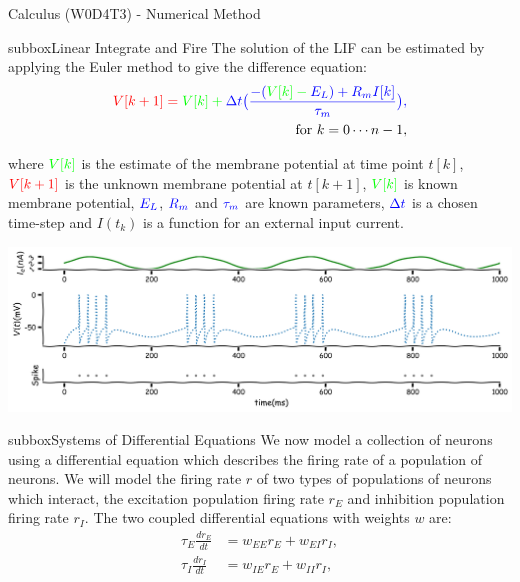 \begin{textbox}{Calculus (W0D4T3) - Numerical Method}
\begin{subbox}{subbox}{Linear Integrate and Fire }
\scriptsize
The solution of the LIF can be estimated by applying the Euler method to give the difference equation:
\begin{align*}
\color{red}{V[k+1]}=\color{green}{V[k]}+\color{blue}{\Delta t}\big(\frac{-(\color{green}{V[k]}-\color{blue}{E_L}) + \color{blue}{R_m}I[k]}{\color{blue}{\tau_m}}\big),\\
\text{for } k=0\cdots n-1,
\end{align*}

where $\color{green}{V[k]}$ is the estimate of the membrane potential at time point $t[k]$,
 $\color{red}{V[k+1]}$ is the unknown membrane potential at $t[k+1]$, $\color{green}{V[k]} $ is known membrane potential, $\color{blue}{E_L}$, $\color{blue}{R_m}$ and $\color{blue}{\tau_m}$ are known parameters, $\color{blue}{\Delta t}$ is a chosen time-step and  $I(t_k)$ is a function for an external input current.
 
\centering
\includegraphics[scale=0.1]{Figures/PreCourse/CFigure8.png}
\end{subbox}

\begin{subbox}{subbox}{Systems of Differential Equations}
\scriptsize
We now model a collection of neurons using a differential equation which describes the firing rate of a population of neurons. 
We will model the firing rate $r$ of two types of populations of neurons which interact, the excitation population firing rate $r_E$ and inhibition population firing rate $r_I$.
 The two coupled differential equations with weights $w$ are:
\begin{align}
\tau_E \frac{dr_E}{dt} &=w_{EE}r_E +w_{EI}r_I, \\
\tau_I \frac{dr_I}{dt} &=w_{IE}r_E +w_{II}r_I ,
\end{align}


\end{subbox}
\end{textbox}
